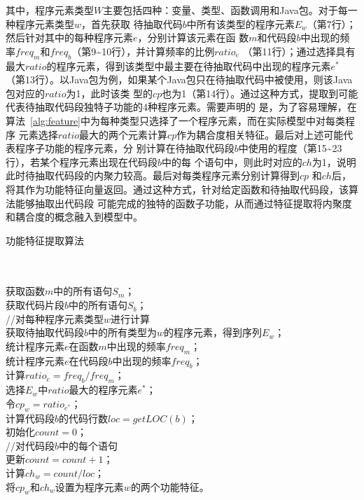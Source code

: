 其中，程序元素类型$W$主要包括四种：变量、类型、函数调用和Java包。对于每一种程序元素类型$w$，首先获取
待抽取代码$b$中所有该类型的程序元素$E_w$（第7行）；然后针对其中的每种程序元素$e$，分别计算该元素在函
数$m$和代码段$b$中出现的频率$freq_m$和$freq_b$（第9\textasciitilde10行），并计算频率的比例$ratio_e$
（第11行）；通过选择具有最大$ratio$的程序元素，得到该类型中最主要在待抽取代码中出现的程序元素$e^*$
（第13行）。以Java包为例，如果某个Java包只在待抽取代码中被使用，则该Java包对应的$ratio$为1，此时该类
型的$cp$也为1（第14行）。通过这种方式，提取到可能代表待抽取代码段独特子功能的4种程序元素。需要声明的
是，为了容易理解，在算法~\ref{alg:feature}中为每种类型只选择了一个程序元素，而在实际模型中对每类程序
元素选择$ratio$最大的两个元素计算$cp$作为耦合度相关特征。最后对上述可能代表程序子功能的程序元素，分
别计算在待抽取代码段$b$中使用的程度（第15\textasciitilde23行），若某个程序元素出现在代码段$b$中的每
个语句中，则此时对应的$ch$为1，说明此时待抽取代码段的内聚力较高。最后对每类程序元素分别计算得到$cp$
和$ch$后，将其作为功能特征向量返回。通过这种方式，针对给定函数和待抽取代码段，该算法能够抽取出代码段
可能完成的独特的函数子功能，从而通过特征提取将内聚度和耦合度的概念融入到模型中。

\begin{algorithm}[H]
\caption{功能特征提取算法}\label{alg:feature}
\\
\\
获取函数$m$中的所有语句$S_m$；\\
获取代码片段$b$中的所有语句$S_b$；\\
 {
  //对每种程序元素类型$w$进行计算\\
  获取待抽取代码段$b$中的所有类型为$w$的程序元素，得到序列$E_w$；\\
   {
    统计程序元素$e$在函数$m$中出现的频率$freq_m$；\\
    统计程序元素$e$在代码段$b$中出现的频率$freq_b$；\\
    计算$ratio_e = freq_b/freq_m$；\\
  }
  选择$E_w$中$ratio$最大的程序元素$e^*$；\\
  令$cp_w = ratio_{e^*}$；\\
  计算代码段$b$的代码行数$loc = getLOC(b)$；\\
  初始化$count = 0$；\\
   {
    //对代码段$b$中的每个语句\\
     {
      更新$count = count + 1$；\\
    }
  }
  计算$ch_w = count/loc$；\\
  将$cp_w$和$ch_w$设置为程序元素$w$的两个功能特征。\\
}
\end{algorithm}
